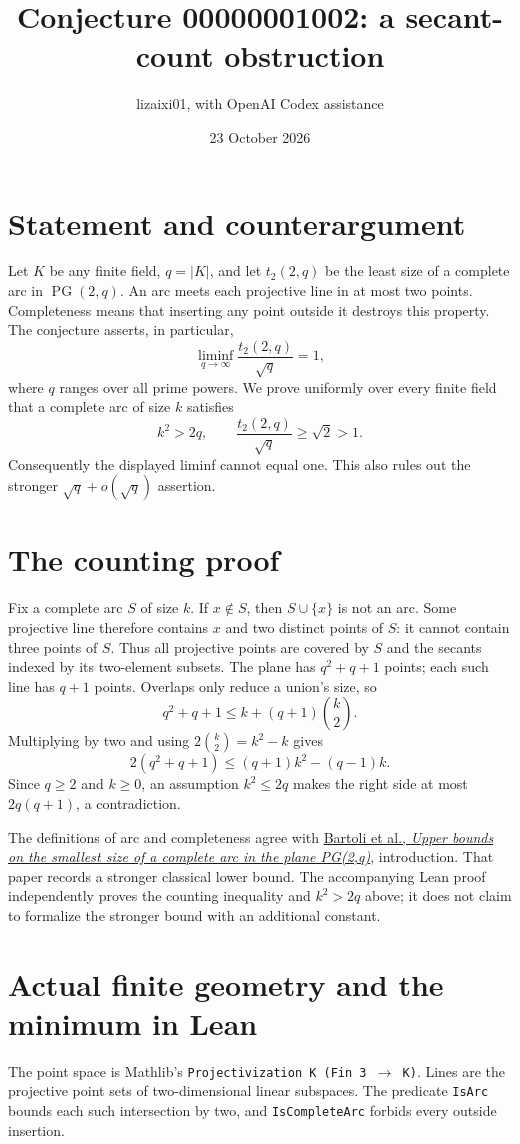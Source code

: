 \documentclass[11pt]{article}
\title{Conjecture 00000001002: a secant-count obstruction}
\author{lizaixi01, with OpenAI Codex assistance}
\date{23 October 2026}
\begin{document}
\maketitle
\section{Statement and counterargument}
Let $K$ be any finite field, $q=|K|$, and let $t_2(2,q)$ be the
least size of a complete arc in $\operatorname{PG}(2,q)$. An arc
meets each projective line in at most two points. Completeness
means that inserting any point outside it destroys this property.
The conjecture asserts, in particular,
\[
 \liminf_{q\to\infty}\frac{t_2(2,q)}{\sqrt q}=1,
\]
where $q$ ranges over all prime powers. We prove uniformly over
every finite field that a complete arc of size $k$ satisfies
\[
 k^2>2q,\qquad \frac{t_2(2,q)}{\sqrt q}\geq\sqrt2>1.
\]
Consequently the displayed liminf cannot equal one. This also
rules out the stronger $\sqrt q+o(\sqrt q)$ assertion.

\section{The counting proof}
Fix a complete arc $S$ of size $k$. If $x\notin S$, then $S\cup\{x\}$
is not an arc. Some projective line therefore contains $x$ and
two distinct points of $S$: it cannot contain three points of $S$.
Thus all projective points are covered by $S$ and the secants
indexed by its two-element subsets. The plane has $q^2+q+1$ points;
each such line has $q+1$ points. Overlaps only reduce a union's
size, so
\[
 q^2+q+1\leq k+(q+1)\binom{k}{2}.
\]
Multiplying by two and using $2\binom{k}{2}=k^2-k$ gives
\[
 2(q^2+q+1)\leq(q+1)k^2-(q-1)k.
\]
Since $q\geq2$ and $k\geq0$, an assumption $k^2\leq2q$ makes the
right side at most $2q(q+1)$, a contradiction.

The definitions of arc and completeness agree with
\href{https://arxiv.org/abs/1111.3403}{Bartoli et al.,
\emph{Upper bounds on the smallest size of a complete arc in the
plane PG(2,q)}}, introduction. That paper records a stronger
classical lower bound. The accompanying Lean proof independently
proves the counting inequality and $k^2>2q$ above; it does not
claim to formalize the stronger bound with an additional constant.

\newpage
\section{Actual finite geometry and the minimum in Lean}
The point space is Mathlib's
\texttt{Projectivization K (Fin 3 $\to$ K)}. Lines are the projective
point sets of two-dimensional linear subspaces. The predicate
\texttt{IsArc} bounds each such intersection by two, and
\texttt{IsCompleteArc} forbids every outside insertion.
\end{document}
